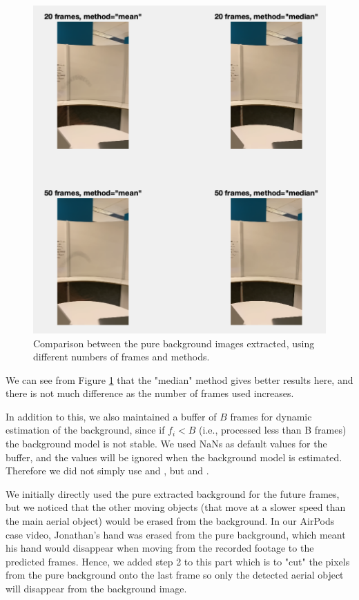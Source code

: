 \documentclass[12pt]{article}
\begin{document}
\begin{figure}[h]
  \centering
    \includegraphics[scale=0.8]{figures/comparison_bg.png}
    \caption{Comparison between the pure background images extracted, using different numbers of frames and methods.}
    \label{Background Comparison}
\end{figure}

We can see from Figure \ref{Background Comparison} that the "median" method gives better results here, and there is not much difference as the number of frames used increases.

In addition to this, we also maintained a buffer of $B$ frames for dynamic estimation of the background, since if $f_i < B$ (i.e., processed less than B frames) the background model is not stable. We used NaNs as default values for the buffer, and the values will be ignored when the background model is estimated. Therefore we did not simply use  and , but  and .

We initially directly used the pure extracted background for the future frames, but we noticed that the other moving objects (that move at a slower speed than the main aerial object) would be erased from the background. In our AirPods case video, Jonathan's hand was erased from the pure background, which meant his hand would disappear when moving from the recorded footage to the predicted frames. Hence, we added step 2 to this part which is to "cut" the pixels from the pure background onto the last frame so only the detected aerial object will disappear from the background image.
\end{document}
